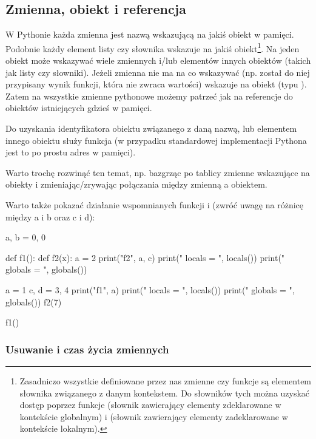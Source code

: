 \documentclass{pdfBooklets}
\begin{document}
\subsection{Zmienna, obiekt i referencja {\Symbola 🤔}}

W Pythonie każda zmienna jest nazwą wskazującą na jakiś obiekt w pamięci. Podobnie każdy element listy czy słownika wskazuje na jakiś obiekt\footnote{
Zasadniczo wszystkie definiowane przez nas zmienne czy funkcje są elementem słownika związanego z danym kontekstem.
Do słowników tych można uzyskać dostęp poprzez funkcje  (słownik zawierający elementy zdeklarowane w kontekście globalnym) i
 (słownik zawierający elementy zadeklarowane w kontekście lokalnym).
}.
Na jeden obiekt może wskazywać wiele zmiennych i/lub elementów innych obiektów (takich jak listy czy słowniki).
Jeżeli zmienna nie ma na co wskazywać (np. został do niej przypisany wynik funkcji, która nie zwraca wartości) wskazuje na obiekt  (typu ).
Zatem na wszystkie zmienne pythonowe możemy patrzeć jak na referencje do obiektów istniejących gdzieś w pamięci.

Do uzyskania identyfikatora obiektu związanego z daną nazwą, lub elementem innego obiektu służy funkcja  (w przypadku standardowej implementacji Pythona jest to po prostu adres w pamięci).

\begin{teacherOnly}
Warto trochę rozwinąć ten temat, np. bazgrząc po tablicy zmienne wskazujące na obiekty i zmieniając/zrywając połączania między zmienną a obiektem.

Warto także pokazać działanie wspomnianych funkcji  i  (zwróć uwagę na różnicę między a i b oraz c i d):
\begin{CodeFrame*}[python]{}
a, b = 0, 0

def f1():
    def f2(x):
       a = 2
       print("f2", a, c)
       print(" locals  = ", locals())
       print(" globals = ", globals())
    
    a = 1
    c, d = 3, 4
    print("f1", a)
    print(" locals  = ", locals())
    print(" globals = ", globals())
    f2(7)

f1()
\end{CodeFrame*}
\end{teacherOnly}

\subsubsection{Usuwanie i czas życia zmiennych {\Symbola 🤔}}
\end{document}
